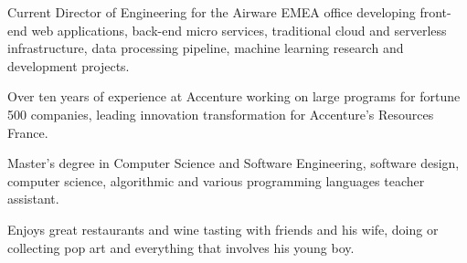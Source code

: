 
\begin{cvparagraph}

Current Director of Engineering for the Airware EMEA office developing front-end web applications, back-end micro services, traditional cloud and serverless infrastructure, data processing pipeline, machine learning research and development projects.

Over ten years of experience at Accenture working on large programs for fortune 500 companies, leading innovation transformation for Accenture’s Resources France.

Master’s degree in Computer Science and Software Engineering, software design, computer science, algorithmic and various programming languages teacher assistant.

Enjoys great restaurants and wine tasting with friends and his wife, doing or collecting pop art and everything that involves his young boy.

\end{cvparagraph}
